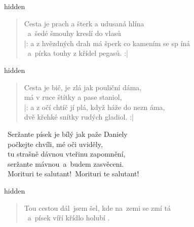 \begin{song}{}
\begin{optional}{hidden}
     
\end{optional}
\begin{verse}
   Cesta je prach a šterk a udusaná hlína \\
   ~a~šedé šmouhy kreslí do vlasů  \\
   |: a z hvězdných drah má šperk co kamením se sp íná \\
      ~a~pírka touhy z křídel pegasů. :|
\end{verse}
  \begin{optional}{hidden}
     
\end{optional}
\begin{verse}
   Cesta je bič, je zlá jak pouliční dáma,  \\
   má v ruce štítky a pase staniol,  \\
   |: a z očí chtíč jí plá, když háže do nezn áma, \\
      dvě křehké snítky rudých gladiol. :|
\end{verse}
\begin{refren}
   ~Seržante písek je bílý jak paže Daniely \\
   ~počkejte chvíli, mé oči uviděly, \\
   ~tu strašně dávnou vteřinu zapomnění, \\
   ~seržante mávnou~a~budem zasvěceni. \\
   ~Morituri te salutant!~Morituri te salutant!
\end{refren}
  \begin{optional}{hidden}
     
\end{optional}
\begin{verse}
   Tou cestou dál~jsem šel, kde na~zemi se zmí tá \\
   ~a~písek víří křídlo holubí . \\

\end{verse}
\end{song}
